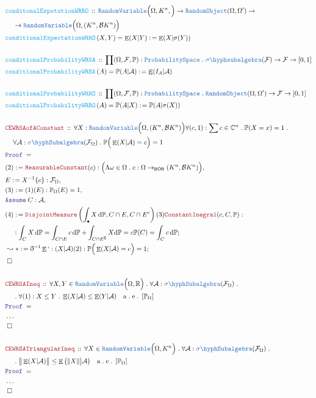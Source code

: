 \documentclass[12pt]{scrartcl}
\newcommand{\TYPE}[1]{\textcolor{NavyBlue}{\mathtt{#1}}}
\newcommand{\FUNC}[1]{\textcolor{Cerulean}{\mathtt{#1}}}
\newcommand{\LOGIC}[1]{\textcolor{Blue}{\mathtt{#1}}}
\newcommand{\THM}[1]{\textcolor{Maroon}{\mathtt{#1}}}
\renewcommand{\.}{\; . \;}
\newcommand{\de}{: \kern 0.1pc =}
\newcommand{\Act}[1]{\left( #1 \right)}
\newcommand{\Theorem}[2]{& \THM{#1} \, :: \, #2 \\ & \Proof = \\ }
\newcommand{\DeclareFunc}[2]{& \FUNC{#1} \, :: \, #2 \\}
\newcommand{\DefineNamedFunc}[4]{&  \FUNC{#1}\Act{#2} = #3 \de #4 \\}
\newcommand{\NewLine}{\\ & \kern 1pc}
\newcommand{\Page}[1]{\begin{align*} #1 \end{align*}   }
\newcommand{ \bd }{ \ByDef }
\newcommand{\NoProof}{ & \ldots \\ \EndProof}
\newcommand{\Reals}{\mathbb{R} }
\newcommand{\Complex}{\mathbb{C}}
\renewcommand{\c}{\complement}
\newcommand{\Say}[3]{& #1 \de #2 : #3, \\}
\newcommand{\Conclude}[3]{& #1 \de #2 : #3; \\}
\newcommand{\DeriveConclude}[3]{& \leadsto #1 \de #2 : #3 ; \\}
\newcommand{\A}{\LOGIC{Assume} \;}
\newcommand{\Assume}[2]{& \A #1 : #2, \\}
\newcommand{\QED}{\; \square}
\newcommand{\EndProof}{& \QED \\}
\newcommand{\ByDef}{\eth}
\newcommand{\Proof}{\LOGIC{Proof} \; }
\renewcommand{\AE}[1]{\quad \mathrm{a\. e\.} \left[#1\right] }
\newcommand{\BOR}{\mathsf{BOR}}
\newcommand{\F}{\mathcal{F}}
\renewcommand{\O}{\Omega}
\newcommand{\B}{\mathcal{B}}
\renewcommand{\P}{\mathbb{P}}
\newcommand{\RV}{\TYPE{RandomVariable}}
\newcommand{\RO}{\TYPE{RandomObject}}
\DeclareMathOperator*{\Exp}{\mathbb{E}}
\begin{document}
\Page{
	\DeclareFunc{conditonalExpetationWRRO}{\RV\Big(\O, K^n, \Big) \to \RO(\O,\O') \to \NewLine \to \RV\Big(\O, (K^n,\B K^n) \Big)}
	\DefineNamedFunc{conditionalExpectationWRRO}{X,Y}{\Exp(X|Y)}{ \Exp(X|\sigma(Y)) } 
	\\
	\DeclareFunc{conditionalProbabilityWRSA}{ \prod (\O,\F,\P) : \TYPE{ProbabilitySpace} \. \TYPE{\sigma\hyph subalgebra}(\F) \to \F \to [0,1]    }
	\DefineNamedFunc{conditionalProbabilityWRSA}{A}{\P(A|\mathcal{A})}{\Exp( I_A | \mathcal{A}  )}
	\\
	\DeclareFunc{conditionalProbabilityWRRO}{ \prod (\O,\F,\P) : \TYPE{ProbabilitySpace} \.  \RO(\O,\O') \to \F \to [0,1]   }
	\DefineNamedFunc{conditionalProbabilityWRRO}{A}{\P(A|X)}{\P(A|\sigma(X))} 
	\\
	\Theorem{CEWRSAofAConstant}{\forall X : \RV\Big(\O, (K^n,\B K^n) \Big) \forall (c,1) : \sum c \in \Complex^n \. \P(X = x) = 1 \. 
	\NewLine
	\forall  \mathcal{A} : \TYPE{\sigma\hyph Subalgebra}(\F_\O) \. \P\Big( \Exp(X|\mathcal{A}) = c \Big) = 1 }
	\Say{(2)}{\THM{MeasurableConstant}(c)}{ \Big( \Lambda \omega \in \O \. c : \O \to_\BOR (K^n,\B K^n ) \Big) }
	\Say{E}{ X^{-1}\{c\}}{\F_\O}
	\Say{(3)}{(1)(E)}{\P_\O(E) = 1}
	\Assume{C}{\mathcal{A}}
	\Conclude{(4)}{ 
		\THM{DisjointMeasure}\left(\int_\bullet X \, \mathrm{d}\P,C \cap E,C \cap E^c\right) 
		(3)
		\THM{ConstantInegral}(c,C,\P)
	}
	{ 
		\NewLine :
		\int_C X \, \mathrm{d}\P =  \int_{C \cap E} c \, \mathrm{d}\P + \int_{C \cap E^\c} X \mathrm{d}\P = c\P(C) = \int_C c \, \mathrm{d}\P
	}
	\DeriveConclude{*}{\bd^{-1} \Exp`:(X|\mathcal{A})(2)}{ \P\Big( \Exp(X|\mathcal{A}) = c \Big) = 1  }
	\EndProof
	\\
	\Theorem{CEWRSAIneq}{
		\forall X,Y \in \RV\Big( \O, \Reals  \Big) \. \forall \mathcal{A} : \TYPE{\sigma \hyph Subalgebra}(\F_\O) \. 
		\NewLine \.
		\forall (1) : X \le Y \.  \Exp(X| \mathcal{A}) \le \Exp(Y|\mathcal{A}) \AE{\P_\O}
	}
	\NoProof
	\\
	\Theorem{CEWRSATriangularIneq}{
		\forall X \in \RV\Big( \O, K^n \Big) \. \forall \mathcal{A} : \TYPE{\sigma \hyph Subalgebra}(\F_\O) \. 
		\NewLine \.
		\big\| \Exp( X |  \mathcal{A} )  \big\|  \le \Exp\big( \|X\| \big| \mathcal{A} \big) \AE{\P_\O}
	}
	\NoProof
}
\end{document}
